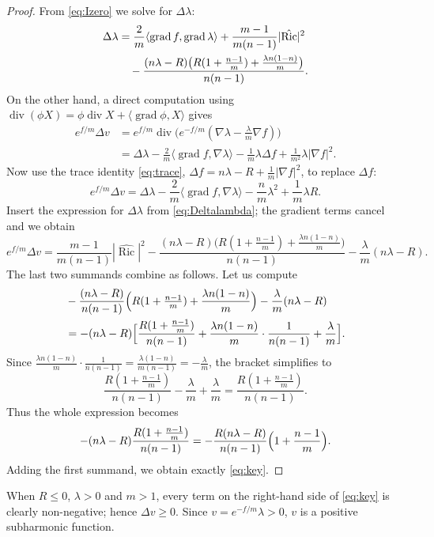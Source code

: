 \documentclass[12pt,a4paper]{article}
\newcommand{\Ric}{\operatorname{Ric}}
\newcommand{\grad}{\operatorname{grad}}
\newcommand{\divg}{\operatorname{div}}
\theoremstyle{definition}
\theoremstyle{definition}
\begin{document}
\begin{proof}
From \eqref{eq:Izero} we solve for $\Delta\lambda$:
\begin{align}
\Delta\lambda &= \frac{2}{m}\langle\grad f,\grad\lambda\rangle
+ \frac{m-1}{m(n-1)}|\hat{\Ric}|^2 \notag\\
&\quad - \frac{(n\lambda-R)\bigl(R(1+\frac{n-1}{m}) + \frac{\lambda n(1-n)}{m}\bigr)}{n(n-1)}. \label{eq:Deltalambda}
\end{align}
On the other hand, a direct computation using $\divg(\phi X)=\phi\divg X+\langle\grad\phi,X\rangle$ gives
\begin{align*}
e^{f/m}\Delta v &= e^{f/m}\divg\bigl( e^{-f/m}(\nabla\lambda - \tfrac{\lambda}{m}\nabla f) \bigr)\\
&= \Delta\lambda - \frac{2}{m}\langle\grad f,\nabla\lambda\rangle
- \frac{1}{m}\lambda\Delta f + \frac{1}{m^2}\lambda|\nabla f|^2.
\end{align*}
Now use the trace identity \eqref{eq:trace}, $\Delta f = n\lambda - R + \frac{1}{m}|\nabla f|^2$, to replace $\Delta f$:
\[
e^{f/m}\Delta v = \Delta\lambda - \frac{2}{m}\langle\grad f,\nabla\lambda\rangle
- \frac{n}{m}\lambda^2 + \frac{1}{m}\lambda R.
\]
Insert the expression for $\Delta\lambda$ from \eqref{eq:Deltalambda}; the gradient terms cancel and we obtain
\[
e^{f/m}\Delta v = \frac{m-1}{m(n-1)}|\hat{\Ric}|^2
- \frac{(n\lambda-R)\bigl(R(1+\frac{n-1}{m}) + \frac{\lambda n(1-n)}{m}\bigr)}{n(n-1)}
- \frac{\lambda}{m}(n\lambda-R).
\]
The last two summands combine as follows.
Let us compute
\begin{align*}
&-\frac{(n\lambda-R)}{n(n-1)}\Bigl(R(1+\tfrac{n-1}{m}) + \frac{\lambda n(1-n)}{m}\Bigr) - \frac{\lambda}{m}(n\lambda-R)\\
&= -(n\lambda-R)\Bigl[ \frac{R(1+\frac{n-1}{m})}{n(n-1)} + \frac{\lambda n(1-n)}{m}\cdot\frac{1}{n(n-1)} + \frac{\lambda}{m} \Bigr].
\end{align*}
Since $\frac{\lambda n(1-n)}{m}\cdot\frac{1}{n(n-1)} = \frac{\lambda(1-n)}{m(n-1)} = -\frac{\lambda}{m}$, the bracket simplifies to
\[
\frac{R(1+\frac{n-1}{m})}{n(n-1)} - \frac{\lambda}{m} + \frac{\lambda}{m}
= \frac{R(1+\frac{n-1}{m})}{n(n-1)}.
\]
Thus the whole expression becomes
\[
-(n\lambda-R)\frac{R(1+\frac{n-1}{m})}{n(n-1)}
= -\frac{R(n\lambda-R)}{n(n-1)}\Bigl(1+\frac{n-1}{m}\Bigr).
\]
Adding the first summand, we obtain exactly \eqref{eq:key}.
\end{proof}

When $R\le 0$, $\lambda>0$ and $m>1$, every term on the right-hand side of \eqref{eq:key} is clearly non-negative; hence $\Delta v\ge 0$.
Since $v=e^{-f/m}\lambda>0$, $v$ is a positive subharmonic function.
\end{document}
